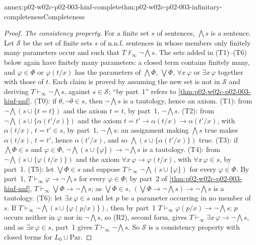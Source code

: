 \begin{annexitem}{annex:p02-w02c-p02-003-hinf-complete}{thm:p02-w02c-p02-003-infinitary-completeness}{Completeness}
\begin{proof}
\emph{The consistency property.}  For a finite set \(s\) of sentences,
\(\bigwedge s\) is a sentence.  Let \(\mathcal S\) be the set of finite
sets \(s\) of n.n.f. sentences in whose members only finitely many
parameters occur and such that \(T\nvdash_{\infty}\neg\bigwedge s\).  The
sets added in (T1)--(T6) below again have finitely many parameters: a
closed term contains finitely many, and \(\varphi\in\Phi\) or
\(\varphi(t/x)\) has the parameters of \(\bigwedge\Phi\), \(\bigvee\Phi\),
\(\forall x\,\varphi\) or \(\exists x\,\varphi\) together with those of
\(t\).  Each claim is proved by assuming the new set is not in
\(\mathcal S\) and deriving \(T\vdash_{\infty}\neg\bigwedge s\), against
\(s\in\mathcal S\); ``by part~1'' refers to
\cref{thm:p02-w02c-p02-003-hinf-nnf}.
(T0): if \(\theta,\neg\theta\in s\), then \(\neg\bigwedge s\) is a
tautology, hence an axiom.
(T1): from \(\neg\bigwedge(s\cup\{t=t\})\) and the axiom \(t=t\), by
part~1, \(\neg\bigwedge s\).
(T2): from \(\neg\bigwedge(s\cup\{\alpha(t'/x)\})\) and the axiom
\(t=t'\to\alpha(t/x)\to\alpha(t'/x)\), with \(\alpha(t/x)\), \(t=t'\in s\),
by part~1, \(\neg\bigwedge s\): an assignment making \(\bigwedge s\) true
makes \(\alpha(t/x)\), \(t=t'\), hence \(\alpha(t'/x)\), and so
\(\bigwedge(s\cup\{\alpha(t'/x)\})\) true.
(T3): if \(\bigwedge\Phi\in s\) and \(\varphi\in\Phi\),
\(\neg\bigwedge(s\cup\{\varphi\})\to\neg\bigwedge s\) is a tautology.
(T4): from \(\neg\bigwedge(s\cup\{\varphi(t/x)\})\) and the axiom
\(\forall x\,\varphi\to\varphi(t/x)\), with \(\forall x\,\varphi\in s\), by
part~1.
(T5): let \(\bigvee\Phi\in s\) and suppose
\(T\vdash_{\infty}\neg\bigwedge(s\cup\{\varphi\})\) for every
\(\varphi\in\Phi\).  By part~1, \(T\vdash_{\infty}\varphi\to\neg\bigwedge s\)
for every \(\varphi\in\Phi\); by part~2 of
\cref{thm:p02-w02c-p02-003-hinf-nnf},
\(T\vdash_{\infty}\bigvee\Phi\to\neg\bigwedge s\); as \(\bigvee\Phi\in s\),
\((\bigvee\Phi\to\neg\bigwedge s)\to\neg\bigwedge s\) is a tautology.
(T6): let \(\exists x\,\varphi\in s\) and let \(p\) be a parameter
occurring in no member of \(s\).  If
\(T\vdash_{\infty}\neg\bigwedge(s\cup\{\varphi(p/x)\})\), then by part~1
\(T\vdash_{\infty}\varphi(p/x)\to\neg\bigwedge s\); \(p\) occurs neither in
\(\varphi\) nor in \(\neg\bigwedge s\), so (R2), second form, gives
\(T\vdash_{\infty}\exists x\,\varphi\to\neg\bigwedge s\), and as
\(\exists x\,\varphi\in s\), part~1 gives \(T\vdash_{\infty}\neg\bigwedge s\).
So \(\mathcal S\) is a consistency property with closed terms for
\(L_0\cup\mathrm{Par}\).


\end{proof}
\end{annexitem}

